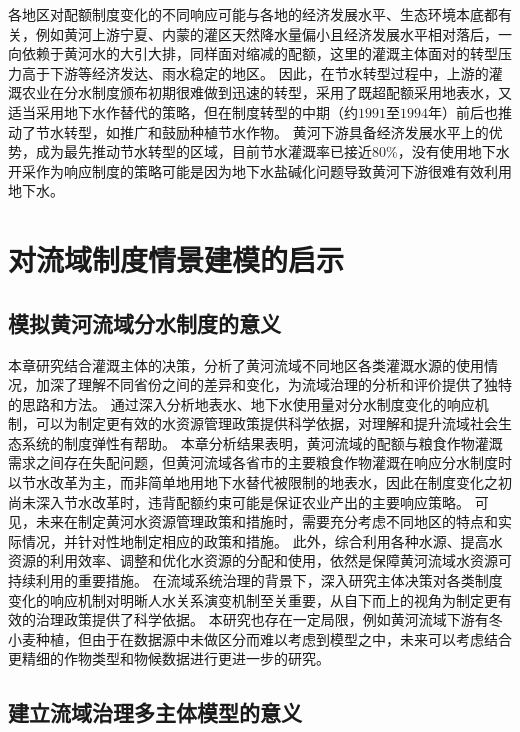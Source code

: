 各地区对配额制度变化的不同响应可能与各地的经济发展水平、生态环境本底都有关，例如黄河上游宁夏、内蒙的灌区天然降水量偏小且经济发展水平相对落后，一向依赖于黄河水的大引大排，同样面对缩减的配额，这里的灌溉主体面对的转型压力高于下游等经济发达、雨水稳定的地区\cite{xiong2021a}。
因此，在节水转型过程中，上游的灌溉农业在分水制度颁布初期很难做到迅速的转型，采用了既超配额采用地表水，又适当采用地下水作替代的策略，但在制度转型的中期（约$1991$至$1994$年）前后也推动了节水转型，如推广和鼓励种植节水作物\cite{yin2021}。
黄河下游具备经济发展水平上的优势，成为最先推动节水转型的区域，目前节水灌溉率已接近$80\%$，没有使用地下水开采作为响应制度的策略可能是因为地下水盐碱化问题导致黄河下游很难有效利用地下水\cite{huangronghan1962, fu2021}。

\section{对流域制度情景建模的启示}

\subsection{模拟黄河流域分水制度的意义}

本章研究结合灌溉主体的决策，分析了黄河流域不同地区各类灌溉水源的使用情况，加深了理解不同省份之间的差异和变化，为流域治理的分析和评价提供了独特的思路和方法。
通过深入分析地表水、地下水使用量对分水制度变化的响应机制，可以为制定更有效的水资源管理政策提供科学依据，对理解和提升流域社会\textendash{}生态系统的制度弹性有帮助。
本章分析结果表明，黄河流域的配额与粮食作物灌溉需求之间存在失配问题，但黄河流域各省市的主要粮食作物灌溉在响应分水制度时以节水改革为主，而非简单地用地下水替代被限制的地表水，因此在制度变化之初尚未深入节水改革时，违背配额约束可能是保证农业产出的主要响应策略。
可见，未来在制定黄河水资源管理政策和措施时，需要充分考虑不同地区的特点和实际情况，并针对性地制定相应的政策和措施。
此外，综合利用各种水源、提高水资源的利用效率、调整和优化水资源的分配和使用，依然是保障黄河流域水资源可持续利用的重要措施。
在流域系统治理的背景下，深入研究主体决策对各类制度变化的响应机制对明晰人\textendash{}水关系演变机制至关重要，从自下而上的视角为制定更有效的治理政策提供了科学依据。
本研究也存在一定局限，例如黄河流域下游有冬小麦种植，但由于在数据源中未做区分而难以考虑到模型之中，未来可以考虑结合更精细的作物类型和物候数据进行更进一步的研究。

\subsection{建立流域治理多主体模型的意义}

